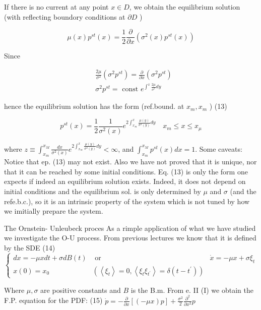 If there is no current at any point $x \in D$, we obtain the equilibrium solution (with reflecting boundory conditions at $\partial D$ )

$$ \mu(x) p^{s t}(x)=\frac{1}{2} \frac{\partial}{\partial x}\left(\sigma^{2}(x) p^{s t}(x)\right) $$

Since

$$ \begin{aligned}
& \frac{2 \mu}{\sigma^{2}}\left(\sigma^{2} p^{s t}\right)=\frac{\partial}{\partial x}\left(\sigma^{2} p^{s t}\right) \\
& \sigma^{2} p^{s t}=\text { const } e^{\int^{x} \frac{2 \mu}{\sigma^{2}} d y}
\end{aligned} $$

hence the equilibrium solution has the form (ref.bound. at $x_{m}, x_{m}$ )
(13)

$$ p^{s t}(x)=\frac{1}{2} \frac{1}{\sigma^{2}(x)} e^{2\int_{x_{m}}^{x} \frac{\mu(y)}{\sigma^{2}(y)} d y} \quad x_{m} \leq x \leq x_{\mu} $$

where $z \equiv \int_{x_{m}}^{x_{M}} \frac{d x}{\sigma^{2}(x)} e^{2 \int_{x_{m}}^{x} \frac{\mu(y)}{\sigma^{2}(y)} d y}<\infty$, and $\int_{x_{m}}^{x_{M}} p^{s t}(x) d x=1$.
Some caveats:
Notice that ep. (13) may not exist. Also we have not proved that it is unique, nor that it can be reached by some initial conditions.
Eq. (13) is only the form one expects if indeed an equilibrium solution exists. Indeed, it does not depend on initial conditions and the equilibrium sol. is only determined by $\mu$ and $\sigma$ (and the refe.b.c.), so it is an intrinsic property of the system which is not tuned by how we imitially prepare the system.

The Ornstein- Unleubeck proces
As a rimple application of what we have studied we investigate the O-U process. From previous lectures we know that it is defined by the SDE
(14) $\left\{\begin{array}{lll}d x=-\mu x d t+\sigma d B(t) & \text { or } & \dot{x}=-\mu x+\sigma \xi_{t} \\ x(0)=x_{0} & \left(\left\langle\xi_{t}\right\rangle=0,\left\langle\xi_{t} \xi_{t^{\prime}}\right\rangle=\delta\left(t-t^{\prime}\right)\right)\end{array}\right.$

Where $\mu, \sigma$ are positive constants and $B$ is the B.m. From e. II (I) we obtain the F.P. equation for the PDF:
(15) $\dot{p}=-\frac{\partial}{\partial x}[(-\mu x) p]+\frac{\sigma^{2}}{2} \frac{\partial^{2}}{\partial x^{2}} p$

